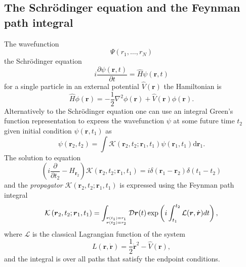 \subsection{The Schr{\"o}dinger equation and the Feynman path integral}
\label{subsec:latt-qm}
The wavefunction
\begin{equation}
	\Psi\left(r_{1}, \ldots, r_{N}\right)
\end{equation}
the Schr\" odinger equation
\begin{equation}
	i \frac{\partial \psi(\boldsymbol{r}, t)}{\partial t}= \hat{H} \psi(\textbf{r}, t)
\end{equation}
for a single particle in an external potential $\hat{V}(\boldsymbol{r})$ the Hamiltonian is 
\begin{equation}
	\hat H \phi(\boldsymbol{r})=-\frac{1}{2} \nabla^{2} \phi(\boldsymbol{r})+\hat{V}(\boldsymbol{r}) \phi(\boldsymbol{r}).
\end{equation}
Alternatively to the Schr\" odinger equation one can use an integral Green's function representation to express the wavefunction $\psi$ at some future time $t_2$ given initial condition $\psi(\boldsymbol{r}, t_1)$ as
\begin{equation}
	\psi\left(\boldsymbol{r}_{2}, t_{2}\right)=\int  \mathcal{K}\left(\boldsymbol{r}_{2}, t_{2} ; \boldsymbol{r}_{1}, t_{1}\right) \psi\left(\boldsymbol{r}_{1}, t_{1}\right) \mathrm{d} \boldsymbol{r}_{1}.
\end{equation}
The solution to  equation
\begin{equation}
	\left(i \frac{\partial}{\partial t_{2}}-H_{\boldsymbol{r}_{2}}\right) \mathcal{K}\left(\boldsymbol{r}_{2}, t_{2} ; \boldsymbol{r}_{1}, t_{1}\right)=i \delta\left(\boldsymbol{r}_{1}-\boldsymbol{r}_{2}\right) \delta\left(t_{1}-t_{2}\right)
\end{equation}
and the \textit{propagator} $\mathcal{K}\left(\boldsymbol{r}_{2}, t_{2} ; \boldsymbol{r}_{1}, t_{1}\right)$ is expressed using the Feynman path integral
\begin{equation}
	\label{eq:FPI}
	\mathcal{K}\left(\boldsymbol{r}_{2}, t_{2} ; \boldsymbol{r}_{1}, t_{1}\right)=\int_{\boldsymbol{r}\left(t_{1}\right)=r_{1} \atop \boldsymbol{r}\left(t_{2}\right)=r_{2}} \mathcal{D} \boldsymbol{r}(t) \exp \left(i \int_{t_{1}}^{t_{2}} \mathcal{L}(\boldsymbol{r}, \dot{\boldsymbol{r}}) d t\right),
\end{equation}
where $\mathcal{L}$ is the classical Lagrangian function of the system
\begin{equation}
	L(\boldsymbol{r}, \dot{\boldsymbol{r}})=\frac{1}{2} \dot{\boldsymbol{r}}^{2}-\hat V(\boldsymbol{r}),
\end{equation}
and the integral is over all paths that satisfy the endpoint conditions.

